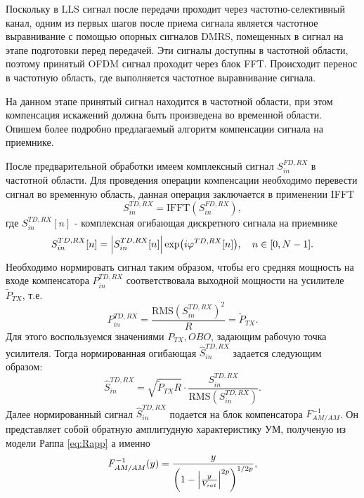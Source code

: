 Поскольку в LLS сигнал после передачи проходит через частотно-селективный
канал, одним из первых шагов после приема сигнала является частотное выравнивание с
помощью опорных сигналов DMRS, помещенных в сигнал на этапе
подготовки перед передачей. Эти сигналы доступны в частотной области,
поэтому принятый OFDM сигнал проходит через блок FFT. Происходит перенос в
частотную область, где выполняется частотное выравнивание сигнала.


На данном этапе принятый сигнал находится в частотной области, при этом
компенсация искажений должна быть произведена во временной области.
Опишем более подробно предлагаемый алгоритм компенсации сигнала на
приемнике.

После предварительной обработки имеем комплексный сигнал $S^{FD, RX}_{in}$ в
частотной области. Для проведения операции компенсации необходимо перевести
сигнал во временную область, данная операция заключается в применении IFFT
\begin{equation}
    S^{TD, RX}_{in} = \text{IFFT}(S^{FD, RX}_{in}),
    \label{eq:comp_ifft}
\end{equation}
где $S^{TD, RX}_{in}[n]$ - комплексная огибающая дискретного сигнала на приемнике
\begin{equation}
    S^{TD, RX}_{in}[n] = \abs{S^{TD,RX}_{in}[n]}\exp(i\varphi^{TD, RX}[n]),\quad n \in[0, N-1].
\end{equation}
Необходимо нормировать сигнал таким образом, чтобы его средняя мощность на
входе компенсатора $P^{TD, RX}_{in}$ соответствовала выходной мощности на
усилителе $\tilde{P}_{TX}$, т.е.
\begin{equation}
    P^{TD, RX}_{in} = \frac{\text{RMS}\left(S^{TD, RX}_{in}\right)^2}{R} = \tilde{P}_{TX}.
\end{equation}
Для этого воспользуемся значениями $P_{TX}, OBO$, задающим рабочую точка
усилителя. Тогда нормированная огибающая $\hat{S}^{TD, RX}_{in}$ задается
следующим образом:
\begin{equation}
    \hat{S}^{TD, RX}_{in} = \sqrt{\tilde{P}_{TX}R} \cdot
    \frac{S^{TD, RX}_{in}}{\text{RMS}\left(S^{TD, RX}_{in}\right)}.
\end{equation}
Далее нормированный сигнал $\hat{S}^{TD, RX}_{in}$ подается на блок
компенсатора $F^{-1}_{AM/AM}$. Он представляет собой обратную амплитудную
характеристику УМ, полученую из модели Раппа \ref{eq:Rapp} а именно
\begin{equation}
    \displaystyle
    F^{-1}_{AM/AM}(y) = 
       \frac{ y}{\left( 1 - \abs{\frac{y}{V_{sat}}}^{2p}\right)^{1/2p}},
    \label{eq:invRapp}
\end{equation}
